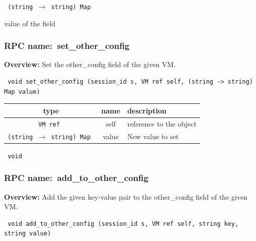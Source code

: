\vspace{0.3cm}

{\tt 
(string $\rightarrow$ string) Map
}


value of the field
\vspace{0.3cm}
\vspace{0.3cm}
\vspace{0.3cm}
\subsubsection{RPC name:~set\_other\_config}

{\bf Overview:} 
Set the other\_config field of the given VM.

\begin{verbatim} void set_other_config (session_id s, VM ref self, (string -> string) Map value)\end{verbatim}



 
\vspace{0.3cm}
\begin{tabular}{|c|c|p{7cm}|}
 \hline
{\bf type} & {\bf name} & {\bf description} \\ \hline
{\tt VM ref } & self & reference to the object \\ \hline 

{\tt (string $\rightarrow$ string) Map } & value & New value to set \\ \hline 

\end{tabular}

\vspace{0.3cm}

{\tt 
void
}



\vspace{0.3cm}
\vspace{0.3cm}
\vspace{0.3cm}
\subsubsection{RPC name:~add\_to\_other\_config}

{\bf Overview:} 
Add the given key-value pair to the other\_config field of the given VM.

\begin{verbatim} void add_to_other_config (session_id s, VM ref self, string key, string value)\end{verbatim}


